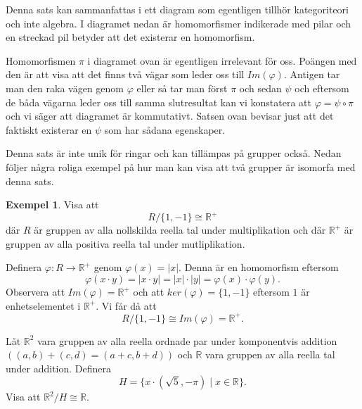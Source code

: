 \documentclass{article}
\theoremstyle{definition}
\newtheorem{exmp}[thm]{Exempel}
\begin{document}
Denna sats kan sammanfattas i ett diagram som egentligen tillhör kategoriteori och inte algebra.
I diagramet nedan är homomorfismer indikerade med pilar och en streckad pil betyder att det existerar en homomorfism. 

\begin{center}
\end{center}

Homomorfismen $\pi$ i diagramet ovan är egentligen irrelevant för oss. Poängen med den är att visa att det finns två vägar som leder oss 
till $Im(\varphi)$. Antigen tar man den raka vägen genom $\varphi$ eller så tar man först $\pi$ och sedan $\psi$ och eftersom 
de båda vägarna leder oss till samma slutresultat kan vi konstatera att $\varphi = \psi \circ \pi$ och vi säger att 
diagramet är kommutativt. Satsen ovan bevisar just 
att det faktiskt existerar en $\psi$ som har sådana egenskaper. 

Denna sats är inte unik för ringar och kan tillämpas på grupper också. Nedan följer några roliga exempel på hur man kan visa att 
två grupper är isomorfa med denna sats. 
\begin{exmp}
  Visa att 
  \[R/\{1, -1\} \cong \mathbb{R}^+\]
  där $R$ är gruppen av alla nollskilda reella tal under multiplikation och där $\mathbb{R}^+$ är gruppen av alla positiva reella tal under mutliplikation.

  Definera $\varphi: R \rightarrow \mathbb{R}^+$ genom $\varphi(x) = |x|.$
  Denna är en homomorfism eftersom 
  \[\varphi(x \cdot y) = |x \cdot y| = |x| \cdot |y| = \varphi(x) \cdot \varphi(y).\]
  Observera att $Im(\varphi) = \mathbb{R}^+$ och att $ker(\varphi) = \{1, -1\}$ eftersom $1$ är enhetselementet i $\mathbb{R}^+$. Vi får då att 
  \[R / \{1, -1\} \cong Im(\varphi) = \mathbb{R}^+.\] 
\end{exmp}

\begin{ovning}{1}
  Låt $\mathbb{R}^2$ vara gruppen av alla reella ordnade par under komponentvis addition $((a, b) + (c, d) = (a + c, b + d))$ och $\mathbb{R}$
  vara gruppen av alla reella tal under addition. Definera 
  \[H = \biggl\{x \cdot (\sqrt 5, -\pi) \; | \; x \in \mathbb{R} \biggr\}.\]
  Visa att $\mathbb{R}^2 / H \cong \mathbb{R}.$
\end{ovning}
\end{document}
